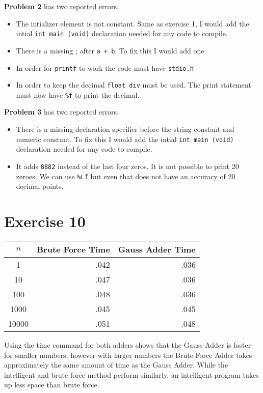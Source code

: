 \documentclass{article}
\begin{document}
\textbf{Problem 2} has two reported errors.
\begin{itemize}
  \item{The intializer element is not constant. Same as exercise 1, I would add the intial \texttt{int main (void)} declaration needed for any code to compile.}
  \item{There is a missing ; after \texttt{a + b}. To fix this I would add one.}
  \item{In order for \texttt{printf} to work the code must have \texttt{stdio.h}}
  \item{In order to keep the decimal \texttt{float div} must be used. The print statement must now have \texttt{\%f} to print the decimal.}
\end{itemize}

\textbf{Problem 3} has two reported errors.
\begin{itemize}
  \item{There is a missing declaration specifier before the string constant and numeric constant. To fix this I would add the intial \texttt{int main (void)} declaration needed for any code to compile.}
  \item{It adds \texttt{8882} instead of the last four zeros. It is not possible to print 20 zeroes. We can use \texttt{\%Lf} but even that does not have an accuracy of 20 decimal points.}
\end{itemize}



\newpage
\section{Exercise 10}

\begin{center} \begin{tabular}{|c|r|r|}
    \hline
    $n$ & Brute Force Time & Gauss Adder Time \\
    \hline
    \hline
    1 & .042 & .036 \\ \hline
    10 & .047 & .036 \\ \hline
    100 & .048 & .036 \\ \hline
    1000 & .045 & .045 \\ \hline
    10000 & .051 & .048 \\ \hline
\end{tabular} \end{center}


Using the time command for both adders shows that the Gauss Adder is faster for smaller numbers, however with larger numbers the Brute Force Adder takes approximately the same amount of time as the Gauss Adder. While the intelligent and brute force method perform similarly, an intelligent program takes up less space than brute force. 
\end{document}
